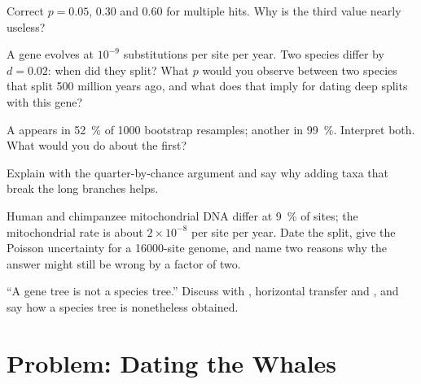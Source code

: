 \begin{exercise}[$\star\star$]\label{exo:b2:phylogenetic-trees:7}
Correct $p = 0.05$, $0.30$ and $0.60$ for multiple hits. Why is the
third value nearly useless?
\end{exercise}

\begin{exercise}[$\star\star$]\label{exo:b2:phylogenetic-trees:8}
A gene evolves at $10^{-9}$ substitutions per site per year. Two
species differ by $d = 0.02$: when did they split? What $p$ would
you observe between two species that split 500 million years ago,
and what does that imply for dating deep splits with this gene?
\end{exercise}

\begin{exercise}[$\star\star$]\label{exo:b2:phylogenetic-trees:9}
A  appears in \qty{52}{\%} of \num{1000} bootstrap resamples;
another in \qty{99}{\%}. Interpret both. What would you do about the
first?
\end{exercise}

\begin{exercise}[$\star\star\star$]\label{exo:b2:phylogenetic-trees:10}
Explain  with the quarter-by-chance argument
and say why adding taxa that break the long branches helps.
\end{exercise}

\begin{exercise}[$\star\star\star$]\label{exo:b2:phylogenetic-trees:11}
Human and chimpanzee mitochondrial DNA differ at \qty{9}{\%} of
sites; the mitochondrial rate is about $2\times 10^{-8}$ per site
per year. Date the split, give the Poisson uncertainty for a
\qty{16000}{}-site genome, and name two reasons why the answer might
still be wrong by a factor of two.
\end{exercise}

\begin{exercise}[$\star\star\star$]\label{exo:b2:phylogenetic-trees:12}
``A gene tree is not a species tree.'' Discuss with , horizontal transfer and , and say
how a species tree is nonetheless obtained.
\end{exercise}

\section{Problem: Dating the Whales}

